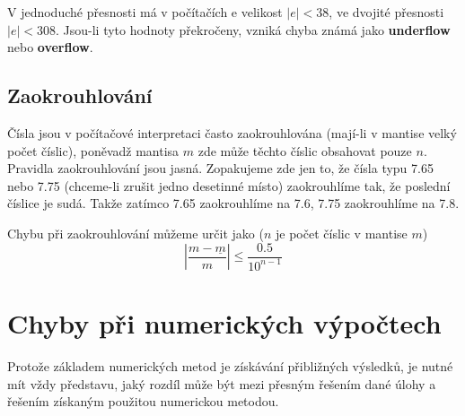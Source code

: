     V jednoduché přesnosti má v počítačích e velikost $|e|< 38$, ve dvojité přesnosti $|e|<308$.
    Jsou-li tyto hodnoty překročeny, vzniká chyba známá jako \textbf{underflow} nebo
    \textbf{overflow}.
  
    \subsection{Zaokrouhlování}
      Čísla jsou v počítačové interpretaci často zaokrouhlována (mají-li v mantise velký počet
      číslic), poněvadž mantisa $m$ zde může těchto číslic obsahovat pouze $n$. Pravidla
      zaokrouhlování jsou jasná. Zopakujeme zde jen to, že čísla typu 7.65 nebo 7.75 (chceme-li
      zrušit jedno desetinné místo) zaokrouhlíme tak, že poslední číslice je sudá. Takže zatímco 
      7.65 zaokrouhlíme na 7.6, 7.75 zaokrouhlíme na 7.8.
  
      Chybu při zaokrouhlování můžeme určit jako ($n$ je počet číslic v mantise $m$)
      \begin{equation}\label{nm:eq_err_round}
        |\frac{m-\underline{m}}{m}|\leq\frac{0.5}{10^{n-1}}
      \end{equation}  
  
  \section{Chyby při numerických výpočtech}
    Protože základem numerických metod je získávání přibližných výsledků, je nutné mít vždy
    představu, jaký rozdíl může být mezi přesným řešením dané úlohy a řešením získaným použitou
    numerickou metodou.
